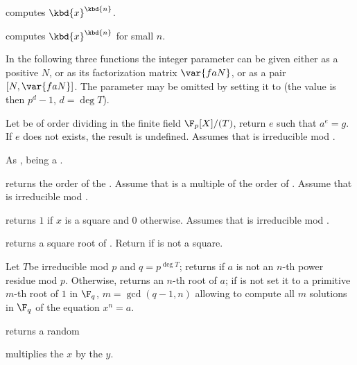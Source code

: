  computes $\kbd{x}^\kbd{n}$.

 computes $\kbd{x}^\kbd{n}$
for small $n$.

In the following three functions the integer parameter  can be given
either as a positive  $N$, or as its factorization matrix $\var{faN}$,
or as a pair $[N,\var{faN}]$. The parameter may be omitted by setting it to
 (the value is then $p^d-1$, $d = \deg T$).

 Let  be of
order dividing  in the finite field $\F_p[X]/(T)$, return $e$ such that
$a^e=g$. If $e$ does not exists, the result is undefined. Assumes
that  is irreducible mod .

 As
,  being a .

 returns the order of the
 . Assume that  is a multiple of the order of
. Assume that  is irreducible mod .

 returns $1$ if $x$ is a square
and $0$ otherwise. Assumes that  is irreducible mod .

 returns a square root of .
Return  if  is not a square.

Let $T$be irreducible mod $p$ and $q = p^{\deg T}$; returns  if $a$
is not an $n$-th power residue mod $p$. Otherwise, returns an $n$-th root of
$a$; if  is not  set it to a primitive $m$-th root of $1$
in $\F_q$, $m = \gcd(q-1,n)$ allowing to compute all $m$ solutions in $\F_q$
of the equation $x^n = a$.


 returns a random 




 multiplies the  $x$
by the  $y$.

